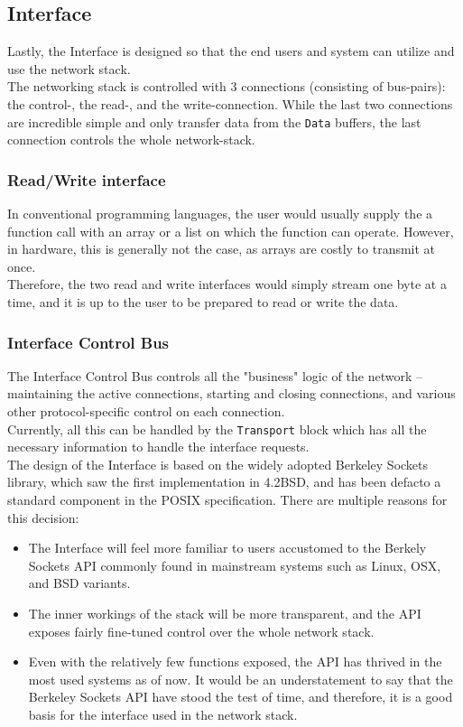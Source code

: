 \subsection{Interface}
Lastly, the Interface is designed so that the end users and system can utilize
and use the network stack.\\
The networking stack is controlled with 3 connections (consisting of bus-pairs):
the control-, the read-, and the write-connection. While the last two connections
are incredible simple and only transfer data from the \texttt{Data} buffers,
the last connection controls the whole network-stack.

\subsubsection{Read/Write interface}
In conventional programming languages, the user would usually supply the a
function call with an array or a list on which the function can operate.
However, in hardware, this is generally not the case, as arrays are costly to
transmit at once.\\
Therefore, the two read and write interfaces would simply stream one byte at a
time, and it is up to the user to be prepared to read or write the data.


\subsubsection{Interface Control Bus}
The Interface Control Bus controls all the "business" logic of the network --
maintaining the active connections, starting and closing connections, and various
other protocol-specific control on each connection.\\
Currently, all this can be handled by the \texttt{Transport} block which has all
the necessary information to handle the interface requests.\\
The design of the Interface is based on the widely adopted Berkeley Sockets library,
which saw the first implementation in 4.2BSD, and has been defacto a standard
component in the POSIX specification\cite{tcpip_illustrated_vol2}. There are
multiple reasons for this decision:
\begin{itemize}
\item The Interface will feel more familiar to users accustomed to the Berkely
Sockets API commonly found in mainstream systems such as Linux, OSX, and BSD
variants.

\item The inner workings of the stack will be more transparent, and the API
exposes fairly fine-tuned control over the whole network stack.

\item Even with the relatively few functions exposed, the API
has thrived in the most used systems as of now. It would be an understatement to
say that the Berkeley Sockets API have stood the test of time, and therefore, it
is a good basis for the interface used in the network stack.

\end{itemize}

